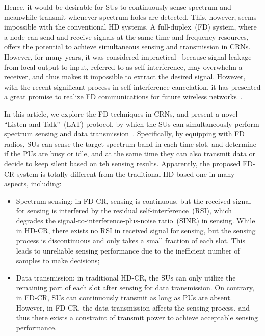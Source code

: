 \documentclass[onecolumn,12pt]{IEEEtran}
\begin{document}
Hence, it would be desirable for SUs to continuously sense spectrum and meanwhile transmit whenever spectrum holes are detected. This, however, seems impossible with the conventional HD systems. A full-duplex~(FD) system, where a node can send and receive signals at the same time and frequency resources, offers the potential to achieve simultaneous sensing and transmission in CRNs. However, for many years, it was considered impractical~\cite{Choi2010} because signal leakage from local output to input, referred to as self interference, may overwhelm a receiver, and thus makes it impossible to extract the desired signal. However, with the recent significant process in self interference cancelation, it has presented a great promise to realize  FD communications for future wireless networks~\cite{Choi2010}.

In this article, we explore the FD techniques in CRNs, and present a novel ``Listen-and-Talk''~(LAT) protocol, by which the SUs can simultaneously perform spectrum sensing and data transmission~\cite{liao2014gc}. Specifically, by equipping with FD radios, SUs can sense the target spectrum band in each time slot, and determine if the PUs are busy or idle, and at the same time they can also transmit data or decide to keep silent based on teh sensing results. Apparently, the proposed FD-CR system is totally different from the traditional HD based one in many aspects, including:
\begin{itemize}
  \item Spectrum sensing: in FD-CR, sensing is continuous, but the received signal for sensing is interfered by the residual self-interference~(RSI), which degrades the signal-to-interference-plus-noise ratio~(SINR) in sensing. While in HD-CR, there exists no RSI in received signal for sensing, but the sensing process is discontinuous and only takes a small fraction of each slot. This leads to unreliable sensing performance due to the inefficient number of samples to make decisions;
  \item Data transmission: in traditional HD-CR, the SUs can only utilize the remaining part of each slot after sensing for data transmission. On contrary, in FD-CR, SUs can continuously transmit as long as PUs are absent. However, in FD-CR, the data transmission affects the sensing process, and thus there exists a constraint of transmit power to achieve acceptable sensing performance.
\end{itemize}
\end{document}
